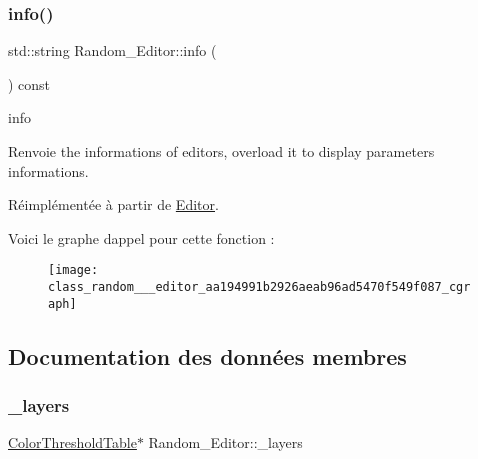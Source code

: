 \subsubsection{\texorpdfstring{info()}{info()}}
{\footnotesize\ttfamily std\+::string Random\+\_\+\+Editor\+::info (\begin{DoxyParamCaption}{ }\end{DoxyParamCaption}) const\hspace{0.3cm}{\ttfamily [virtual]}}



info 

\begin{DoxyReturn}{Renvoie}
the informations of editors, overload it to display parameters informations. 
\end{DoxyReturn}


Réimplémentée à partir de \hyperlink{class_editor_a5747cd74b71d67f6d39b094071058382}{Editor}.

Voici le graphe d\textquotesingle{}appel pour cette fonction \+:\nopagebreak
\begin{figure}[H]
\begin{center}
\leavevmode
\texttt{[image: class\_random\_\_\_editor\_aa194991b2926aeab96ad5470f549f087\_cgraph]}
\end{center}
\end{figure}


\subsection{Documentation des données membres}
\mbox{\label{class_random___editor_af2105a201bbe9cf3ad46137037a6b69d}} 
\subsubsection{\texorpdfstring{\+\_\+layers}{\_layers}}
{\footnotesize\ttfamily \hyperlink{thresholdtable_8h_ab0deb49d07758f9814993774cb9935cc}{Color\+Threshold\+Table}$\ast$ Random\+\_\+\+Editor\+::\+\_\+layers\hspace{0.3cm}{\ttfamily [private]}}

\mbox{\label{class_random___editor_a3f94d9732552caff8f645cd077f4743b}} 
